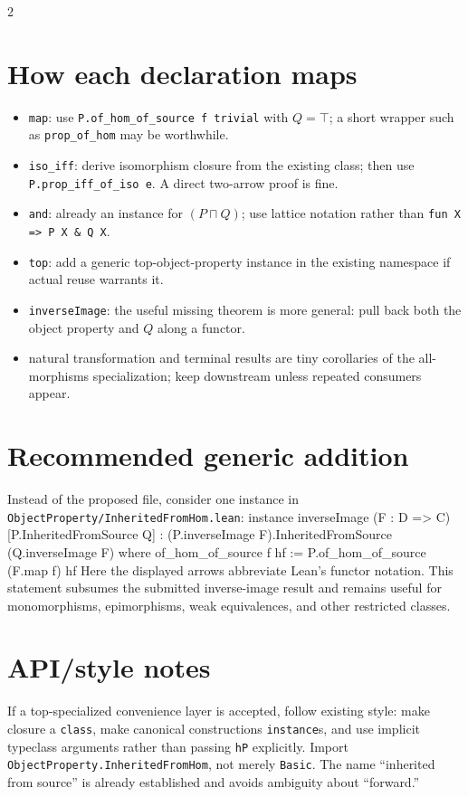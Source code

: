 \documentclass[9pt]{article}
\newenvironment{lean}{\Verbatim[fontsize=\scriptsize,frame=single,framesep=1.2mm,formatcom=\leanfont]}{\endVerbatim}
\begin{document}
\begin{multicols}{2}
\section*{How each declaration maps}
\begin{itemize}\setlength\itemsep{2pt}
\item \texttt{map}: use \texttt{P.of\_hom\_of\_source f trivial} with
  $Q=\top$; a short wrapper such as \texttt{prop\_of\_hom} may be worthwhile.
\item \texttt{iso\_iff}: derive isomorphism closure from the existing class;
  then use \texttt{P.prop\_iff\_of\_iso e}.  A direct two-arrow proof is fine.
\item \texttt{and}: already an instance for $(P\sqcap Q)$; use lattice notation
  rather than \texttt{fun X => P X \& Q X}.
\item \texttt{top}: add a generic top-object-property instance in the existing
  namespace if actual reuse warrants it.
\item \texttt{inverseImage}: the useful missing theorem is more general:
  pull back both the object property and $Q$ along a functor.
\item natural transformation and terminal results are tiny corollaries of the
  all-morphisms specialization; keep downstream unless repeated consumers appear.
\end{itemize}

\columnbreak
\section*{Recommended generic addition}
Instead of the proposed file, consider one instance in
\texttt{ObjectProperty/InheritedFromHom.lean}:
\begin{lean}
instance inverseImage (F : D => C)
    [P.InheritedFromSource Q] :
    (P.inverseImage F).InheritedFromSource
      (Q.inverseImage F) where
  of_hom_of_source f hf :=
    P.of_hom_of_source (F.map f) hf
\end{lean}
Here the displayed arrows abbreviate Lean's functor notation.  This statement
subsumes the submitted inverse-image result and remains useful for monomorphisms,
epimorphisms, weak equivalences, and other restricted classes.

\section*{API/style notes}
If a top-specialized convenience layer is accepted, follow existing style:
make closure a \texttt{class}, make canonical constructions \texttt{instance}s,
and use implicit typeclass arguments rather than passing \texttt{hP} explicitly.
Import \texttt{ObjectProperty.InheritedFromHom}, not merely \texttt{Basic}.
The name ``inherited from source'' is already established and avoids ambiguity
about ``forward.''


\end{multicols}
\end{document}
